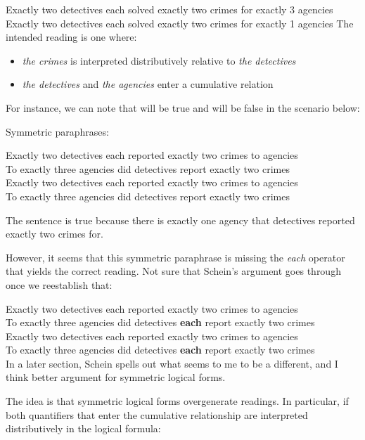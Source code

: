 \documentclass[english]{article}
\begin{document}
\pex
\a 
Exactly two detectives each solved exactly two crimes for exactly 3 agencies
\a 
Exactly two detectives each solved exactly two crimes for exactly 1 agencies
\xe
%
The intended reading is one where:

\begin{itemize}
 	\item \emph{the crimes} is interpreted distributively relative to \emph{the detectives}
 	\item \emph{the detectives} and \emph{the agencies} enter a cumulative relation
 \end{itemize} 
%
For instance, we can note that \clastxa will be true and \clastxb will be false in the scenario below:

\ex

\xe
%
Symmetric paraphrases:

\pex
\a 
Exactly two detectives each reported exactly two crimes to agencies\\
To exactly three agencies did detectives report exactly two crimes\\
\a 
Exactly two detectives each reported exactly two crimes to agencies\\
To exactly three agencies did detectives report exactly two crimes\\
\xe
%
\begin{squ}
The sentence is true because there is exactly one agency that detectives reported exactly two crimes for.
\end{squ}
%
However, it seems that this symmetric paraphrase is missing the \emph{each} operator that yields the correct reading. Not sure that Schein's argument goes through once we reestablish that:

\pex
\a 
Exactly two detectives each reported exactly two crimes to agencies\\
To exactly three agencies did detectives \textbf{each} report exactly two crimes\\
\a 
Exactly two detectives each reported exactly two crimes to agencies\\
To exactly three agencies did detectives \textbf{each} report exactly two crimes\\
\xe
%
In a later section, Schein spells out what seems to me to be a different, and I think better argument for symmetric logical forms. 

The idea is that symmetric logical forms overgenerate readings. In particular, if both quantifiers that enter the cumulative relationship are interpreted distributively in the logical formula:
\end{document}
